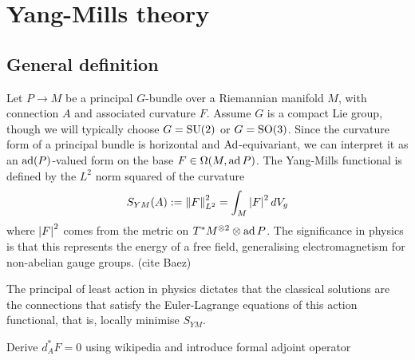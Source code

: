 \section{Yang-Mills theory}
\subsection{General definition}
Let $P\to M$ be a principal $G$-bundle over a Riemannian manifold $M$, with 
connection $A$ and associated curvature  $F$. Assume $G$ is a compact Lie group,
though we will typically choose $G=\operatorname{SU}(2)$ or $G=\operatorname{SO}(3)$. 
Since the curvature form of a principal bundle is horizontal and  
$\operatorname{Ad}$-equivariant, we can interpret it as an $\operatorname{ad}(P)$-valued form on the base 
$F\in\Omega(M,\operatorname{ad} P)$.
The Yang-Mills functional is defined by the $L^2$ norm squared of the curvature 
\[
	S_{YM}(A) := \norm{F}^2_{L^2} = \int_M \abs{F}^2 dV_g
\]
where $\abs{F}^2$ comes from the metric on $T^*M^{\otimes 2}\otimes \operatorname{ad} P$. 
The significance in physics is that this represents the energy of a free field, 
generalising electromagnetism for non-abelian gauge groups.  
(cite Baez)

The principal of least action in physics dictates that the classical solutions
are the connections that satisfy the Euler-Lagrange equations of this action 
functional, that is, locally minimise $S_{YM}$. 

Derive $d_A^* F = 0$ using wikipedia and introduce formal adjoint operator

